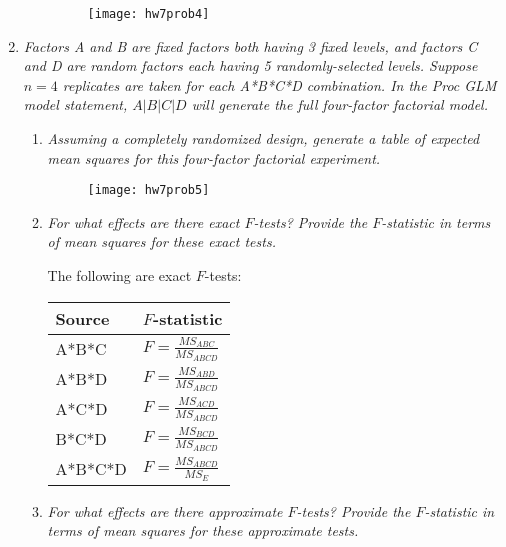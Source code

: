 \documentclass[11pt]{article}
\begin{document}
\begin{enumerate}
\begin{enumerate}
\begin{figure}[H]\centering
\texttt{[image: hw7prob4]}
\end{figure}

\end{enumerate}

\pagebreak
\item %
{\it Factors A and B are fixed factors both having 3 fixed levels, and factors
C and D are random factors each having 5 randomly-selected levels. Suppose
\(n=4\) replicates are taken for each A*B*C*D combination. In the Proc GLM
model statement, \(A|B|C|D\) will generate the full four-factor factorial
model.}

\begin{enumerate}

\item %
{\it Assuming a completely randomized design, generate a table of expected mean
squares for this four-factor factorial experiment.}

\begin{figure}[H]\centering
\texttt{[image: hw7prob5]}
\end{figure}

\item %
{\it For what effects are there exact \(F\)-tests? Provide the \(F\)-statistic
in terms of mean squares for these exact tests.}

The following are exact \(F\)-tests:

\begin{table}[H]\centering\renewcommand{\arraystretch}{1.5}
\begin{tabular}{|l|l|}
\hline
Source & \(F\)-statistic \\
\hline
A*B*C & \(F=\frac{MS_{ABC}}{MS_{ABCD}}\) \\
\hline
A*B*D & \(F=\frac{MS_{ABD}}{MS_{ABCD}}\) \\
\hline
A*C*D & \(F=\frac{MS_{ACD}}{MS_{ABCD}}\) \\
\hline
B*C*D & \(F=\frac{MS_{BCD}}{MS_{ABCD}}\) \\
\hline
A*B*C*D & \(F=\frac{MS_{ABCD}}{MS_E}\) \\
\hline
\end{tabular}
\end{table}

\pagebreak
\item %
{\it For what effects are there approximate \(F\)-tests? Provide the
\(F\)-statistic in terms of mean squares for these approximate tests.}


\end{enumerate}
\end{enumerate}
\end{document}
